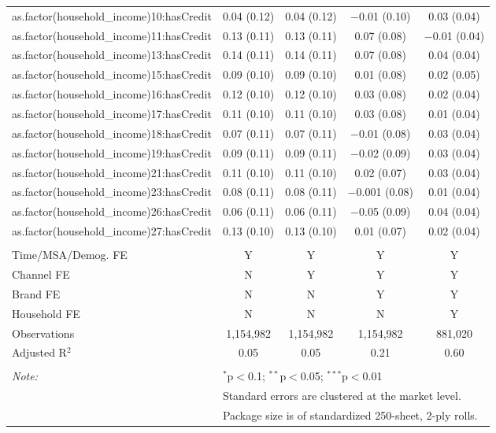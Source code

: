 \begin{table}[!htbp]
\begin{tabular}{@{\extracolsep{5pt}}lcccc}
  as.factor(household\_income)10:hasCredit & 0.04 (0.12) & 0.04 (0.12) & $-$0.01 (0.10) & 0.03 (0.04) \\ 
  as.factor(household\_income)11:hasCredit & 0.13 (0.11) & 0.13 (0.11) & 0.07 (0.08) & $-$0.01 (0.04) \\ 
  as.factor(household\_income)13:hasCredit & 0.14 (0.11) & 0.14 (0.11) & 0.07 (0.08) & 0.04 (0.04) \\ 
  as.factor(household\_income)15:hasCredit & 0.09 (0.10) & 0.09 (0.10) & 0.01 (0.08) & 0.02 (0.05) \\ 
  as.factor(household\_income)16:hasCredit & 0.12 (0.10) & 0.12 (0.10) & 0.03 (0.08) & 0.02 (0.04) \\ 
  as.factor(household\_income)17:hasCredit & 0.11 (0.10) & 0.11 (0.10) & 0.03 (0.08) & 0.01 (0.04) \\ 
  as.factor(household\_income)18:hasCredit & 0.07 (0.11) & 0.07 (0.11) & $-$0.01 (0.08) & 0.03 (0.04) \\ 
  as.factor(household\_income)19:hasCredit & 0.09 (0.11) & 0.09 (0.11) & $-$0.02 (0.09) & 0.03 (0.04) \\ 
  as.factor(household\_income)21:hasCredit & 0.11 (0.10) & 0.11 (0.10) & 0.02 (0.07) & 0.03 (0.04) \\ 
  as.factor(household\_income)23:hasCredit & 0.08 (0.11) & 0.08 (0.11) & $-$0.001 (0.08) & 0.01 (0.04) \\ 
  as.factor(household\_income)26:hasCredit & 0.06 (0.11) & 0.06 (0.11) & $-$0.05 (0.09) & 0.04 (0.04) \\ 
  as.factor(household\_income)27:hasCredit & 0.13 (0.10) & 0.13 (0.10) & 0.01 (0.07) & 0.02 (0.04) \\ 
 \hline \\[-1.8ex] 
Time/MSA/Demog. FE & Y & Y & Y & Y \\ 
Channel FE & N & Y & Y & Y \\ 
Brand FE & N & N & Y & Y \\ 
Household FE & N & N & N & Y \\ 
Observations & 1,154,982 & 1,154,982 & 1,154,982 & 881,020 \\ 
Adjusted R$^{2}$ & 0.05 & 0.05 & 0.21 & 0.60 \\ 
\hline 
\hline \\[-1.8ex] 
\textit{Note:}  & \multicolumn{4}{l}{$^{*}$p$<$0.1; $^{**}$p$<$0.05; $^{***}$p$<$0.01} \\ 
 & \multicolumn{4}{l}{Standard errors are clustered at the market level.} \\ 
 & \multicolumn{4}{l}{Package size is of standardized 250-sheet, 2-ply rolls.} \\ 
\end{tabular} 
\end{table} 

